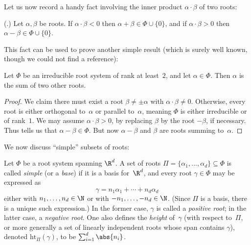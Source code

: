 \documentclass[11pt]{article}
\newcommand{\hgt}{{\mathrm{ht}}}
\begin{document}
Let us now record a handy fact involving the inner product $\alpha \cdot \beta$ of two roots:
\begin{fact}    \label{rootsum}
    (\cite[p.~45, Lem.~9.4]{Hum72}.)
    Let $\alpha, \beta$ be roots.  If $\alpha \cdot \beta < 0$ then $\alpha+\beta \in \Phi \cup \{0\}$, and if $\alpha \cdot \beta > 0$ then $\alpha-\beta \in \Phi \cup \{0\}$.
\end{fact}
This fact can be used to prove another simple result (which is surely well known, though we could not find a reference):
\begin{fact}    \label{fact:rootdecomp}
    Let $\Phi$ be an irreducible root system of rank at least~$2$, and let $\alpha \in \Phi$.  Then $\alpha$ is the sum of two other roots.
\end{fact}
\begin{proof}
    We claim there must exist a root $\beta \neq \pm \alpha$ with $\alpha \cdot \beta \neq 0$.
    Otherwise, every root is either orthogonal to~$\alpha$ or parallel to~$\alpha$, meaning $\Phi$ is either irreducible or of rank~$1$.
    We may assume $\alpha \cdot \beta > 0$, by replacing $\beta$ by the root $-\beta$, if necessary.
    Thus  tells us that $\alpha - \beta \in \Phi$.
    But now $\alpha - \beta$ and $\beta$ are roots summing to~$\alpha$.
\end{proof}



We now discuss ``simple'' subsets of roots:
\begin{definition}  \label{def:simple}
    Let $\Phi$ be a root system spanning $\R^d$.
    A set of roots $\Pi = \{\alpha_1, \dots, \alpha_d\} \subseteq \Phi$ is called \emph{simple} (or a \emph{base}) if it is a basis for~$\R^d$, and
    every root $\gamma \in \Phi$ may be expressed as
    \[
        \gamma = n_1 \alpha_1 + \cdots + n_d \alpha_d
    \]
    either with $n_1, \dots, n_d \in \N$ or with $-n_1, \dots, -n_d \in \N$.
    (Since $\Pi$ is a basis, there is a unique such expression.)
    In the former case, $\gamma$ is called a \emph{positive root}; in the latter case,  a \emph{negative root}.
    One also defines the \emph{height} of~$\gamma$ (with respect to~$\Pi$, or more generally a set of linearly independent roots whose span contains $\gamma$), denoted $\hgt_\Pi(\gamma)$, to be $\sum_{i=1}^d \abs{n_i}$.
\end{definition}
\end{document}
